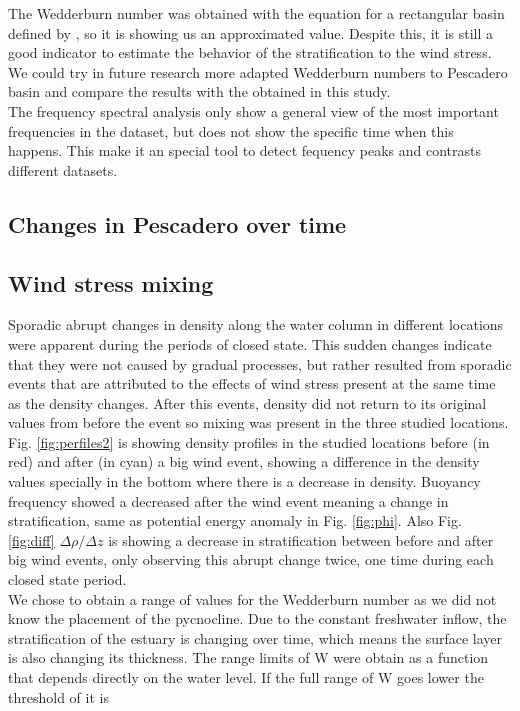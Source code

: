 \documentclass[tesis.tex]{subfiles}
\begin{document}
The Wedderburn number was obtained with the equation for a rectangular basin defined by \cite{Monismith1985}, so it is showing us an approximated value. Despite this, it is still a good indicator to estimate the behavior of the stratification to the wind stress. We could try in future research more adapted Wedderburn numbers to Pescadero basin and compare the results with the obtained in this study.\\

The frequency spectral analysis only show a general view of the most important frequencies in the dataset, but does not show the specific time when this happens. This make it an special tool to detect fequency peaks and contrasts different datasets.\\

\subsection{Changes in Pescadero over time}

\subsection{Wind stress mixing}

Sporadic abrupt changes in density along the water column in different locations were apparent during the periods of closed state. This sudden changes indicate that they were not caused by gradual processes, but rather resulted from sporadic events that are attributed to the effects of wind stress present at the same time as the density changes. After this events, density did not return to its original values from before the event so mixing was present in the three studied locations.\\

Fig. \ref{fig:perfiles2} is showing density profiles in the studied locations before (in red) and after (in cyan) a big wind event, showing a difference in the density values specially in the bottom where there is a decrease in density. Buoyancy frequency showed a decreased after the wind event meaning a change in stratification, same as potential energy anomaly in Fig. \ref{fig:phi}. Also Fig. \ref{fig:diff} $\Delta \rho/\Delta z$ is showing a decrease in stratification between before and after big wind events, only observing this abrupt change twice, one time during each closed state period.\\

We chose to obtain a range of values for the Wedderburn number as we did not know the placement of the pycnocline. Due to the constant freshwater inflow, the stratification of the estuary is changing over time, which means the surface layer is also changing its thickness. The range limits of W were obtain as a function that depends directly on the water level. If the full range of W goes lower the threshold of it is 
\end{document}
